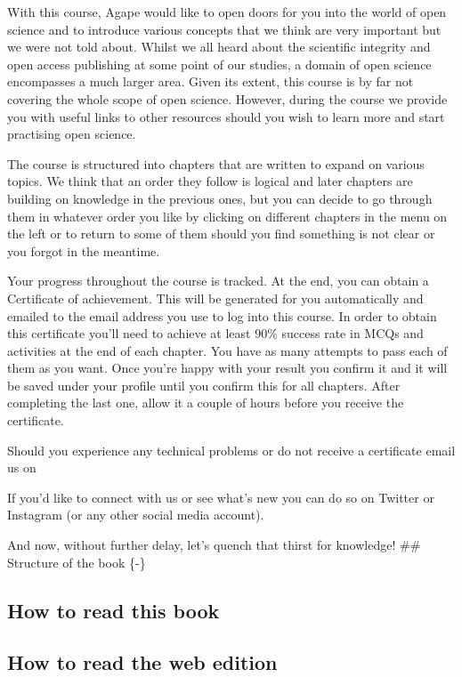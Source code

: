 \documentclass[
]{book}
\begin{document}
With this course, Agape would like to open doors for you into the world of open science and to introduce various concepts that we think are very important but we were not told about. Whilst we all heard about the scientific integrity and open access publishing at some point of our studies, a domain of open science encompasses a much larger area. Given its extent, this course is by far not covering the whole scope of open science. However, during the course we provide you with useful links to other resources should you wish to learn more and start practising open science.

The course is structured into chapters that are written to expand on various topics. We think that an order they follow is logical and later chapters are building on knowledge in the previous ones, but you can decide to go through them in whatever order you like by clicking on different chapters in the menu on the left or to return to some of them should you find something is not clear or you forgot in the meantime.

Your progress throughout the course is tracked. At the end, you can obtain a Certificate of achievement. This will be generated for you automatically and emailed to the email address you use to log into this course. In order to obtain this certificate you'll need to achieve at least 90\% success rate in MCQs and activities at the end of each chapter. You have as many attempts to pass each of them as you want. Once you're happy with your result you confirm it and it will be saved under your profile until you confirm this for all chapters. After completing the last one, allow it a couple of hours before you receive the certificate.

Should you experience any technical problems or do not receive a certificate email us on

If you'd like to connect with us or see what's new you can do so on Twitter or Instagram (or any other social media account).

And now, without further delay, let's quench that thirst for knowledge!
\#\# Structure of the book \{-\}

\hypertarget{how-to-read-this-book}{%
\subsection*{How to read this book}\label{how-to-read-this-book}}

\hypertarget{how-to-read-the-web-edition}{%
\subsection*{How to read the web edition}\label{how-to-read-the-web-edition}}
\end{document}
